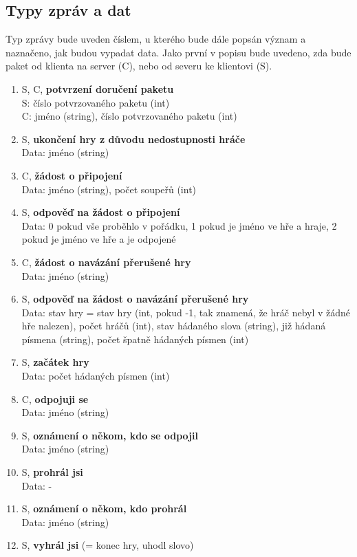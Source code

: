 \documentclass[12pt, a4paper]{article}
\begin{document}
	\subsection{Typy zpráv a dat}
	Typ zprávy bude uveden číslem, u kterého bude dále popsán význam a naznačeno, jak budou vypadat data. Jako první v popisu bude uvedeno, zda bude paket od klienta na server (C), nebo od severu ke klientovi (S).
		\begin{enumerate}
		\item S, C, \textbf{potvrzení doručení paketu}\\
		S: číslo potvrzovaného paketu (int)\\
		C: jméno (string), číslo potvrzovaného paketu (int)
		\item S, \textbf{ukončení hry z důvodu nedostupnosti hráče}\\
		Data: jméno (string)
		\item C, \textbf{žádost o připojení}\\
		Data: jméno (string), počet soupeřů (int)
		\item S, \textbf{odpověď na žádost o připojení}\\
		Data:	0 pokud vše proběhlo v pořádku, 1 pokud je jméno ve hře a hraje, 2 pokud je jméno ve hře a je odpojené
		\item C, \textbf{žádost o navázání přerušené hry}\\
		Data: jméno (string)
		\item S, \textbf{odpověď na žádost o navázání přerušené hry}\\
		Data: stav hry = stav hry (int, pokud -1, tak znamená, že hráč nebyl v žádné hře nalezen), počet hráčů (int), stav hádaného slova (string), již hádaná písmena (string), počet špatně hádaných písmen (int)
		\item S, \textbf{začátek hry}\\
		Data: počet hádaných písmen (int)
		\item C, \textbf{odpojuji se}\\
		Data: jméno (string)
		\item S, \textbf{oznámení o někom, kdo se odpojil}\\
		Data: jméno (string)
		\item S, \textbf{prohrál jsi}\\
		Data: -
		\item S, \textbf{oznámení o někom, kdo prohrál}\\
		Data: jméno (string)
		\item S, \textbf{vyhrál jsi} (= konec hry, uhodl slovo)\\

\end{enumerate}
\end{document}
